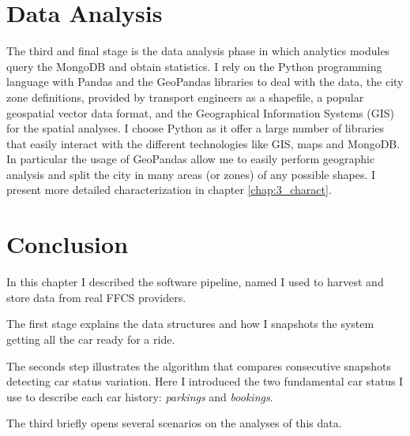 


\section{Data Analysis}
The third and final stage is the data analysis phase in which analytics modules query the MongoDB and obtain statistics. I rely on the Python programming language with Pandas and the GeoPandas libraries to deal with the data, the city zone definitions, provided by transport engineers as a shapefile, a popular geospatial vector data format, and the Geographical Information Systems (GIS) for the spatial analyses. I choose Python as it offer a large number of  libraries that easily interact with the different technologies like GIS, maps and MongoDB. In particular the usage of GeoPandas allow me to easily perform geographic analysis and split the city in many areas (or zones) of any possible shapes. I present more detailed characterization in chapter \ref{chap:3_charact}.


\section{Conclusion}
In this chapter I described the software pipeline, named \tool I used to harvest and store data from real FFCS providers. 

The first stage explains the data structures and how I snapshots the system getting all the car ready for a ride. 

The seconds step illustrates the algorithm that compares consecutive snapshots detecting car status variation. Here I introduced the two fundamental car status I use to describe each car history: \textit{parkings} and \textit{bookings}. 

The third briefly opens several scenarios on the analyses of this data.


